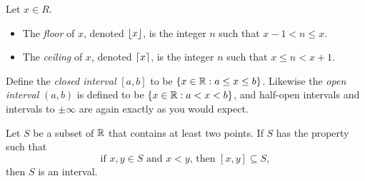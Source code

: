 \begin{definition}
  Let $x \in R$.
  \begin{itemize}
    \item The \textit{floor} of $x$, denoted $\lfloor x \rfloor$, is the
      integer $n$ such that $x  - 1 < n \leq x$.
    \item The \textit{ceiling} of $x$, denoted $\lceil x \rceil$, is the
      integer $n$ such that $x \leq n < x + 1$.
  \end{itemize}
\end{definition}

\begin{definition}
  Define the \textit{closed interval} $[a, b]$ to be $\{ x \in \mathbb R
  : a \leq x \leq b \}$. Likewise the \textit{open interval} $(a, b)$
  is defined to be $\{ x \in \mathbb R : a < x < b \}$, and half-open
  intervals and intervals to $\pm\infty$ are again exactly as you would expect.
\end{definition}

\begin{theorem}
  Let $S$ be a subset of $\mathbb R$ that contains at least two points. If
  $S$ has the property such that
  \[ \text{if $x, y \in S$ and $x < y$, then $[x, y] \subseteq S$}, \tag{1} \]
  then $S$ is an interval.
\end{theorem}

